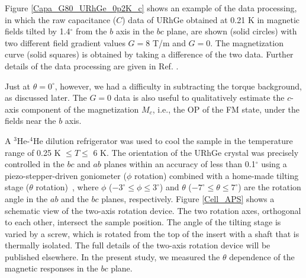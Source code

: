 \documentclass[twocolumn, aps, superscriptaddress, amsfonts,floatfix]{revtex4}%
\begin{document}
Figure \ref{Capa_G80_URhGe_0p2K_c} shows an example of the data processing, in which the raw capacitance ($C$) data of URhGe obtained at 0.21 K in magnetic fields tilted by 1.4$^\circ$ from the $b$ axis in the $bc$ plane, are shown (solid circles) with two different field gradient values $G = 8$ T/m and $G = 0$.  The magnetization curve (solid squares) is obtained by taking a difference of the two data.
Further details of the data processing are given in Ref. \cite{sakakibara1994faraday}.
{Just at $\theta=0^\circ$, however, we had a difficulty in subtracting the torque background, as discussed later. 
The $G=0$ data is also useful to qualitatively estimate the $c$-axis component of the magnetization $M_c$, i.e., the OP of the FM state, under the fields near the $b$ axis.



 A $^3$He-$^4$He dilution refrigerator was used to cool the sample in the temperature range of 0.25 K $\leq T \leq$ 6 K.
The orientation of the URhGe crystal was precisely controlled in the $bc$ and $ab$ planes within an accuracy of less than 0.1$^\circ$ using a piezo-stepper-driven goniometer ($\phi$ rotation) combined with a home-made tilting stage ($\theta$ rotation)~\cite{PhysRevB.90.220502}, where $\phi$ ($-3^\circ \leq \phi \leq 3^\circ$) and $\theta$ ($-7^\circ \leq \theta \leq 7^\circ$) are the rotation angle in the $ab$ and the $bc$ planes, respectively.
Figure \ref{Cell_APS} shows a schematic view of the two-axis rotation device.
The two rotation axes, orthogonal to each other, intersect  the sample position. 
The angle of the tilting stage is varied by a screw, which is rotated from the top of the insert with a shaft that is thermally isolated.
The full details of the two-axis rotation device will be published elsewhere.
 In the present study, we measured the $\theta$ dependence of the magnetic responses in the $bc$ plane.


}
\end{document}
